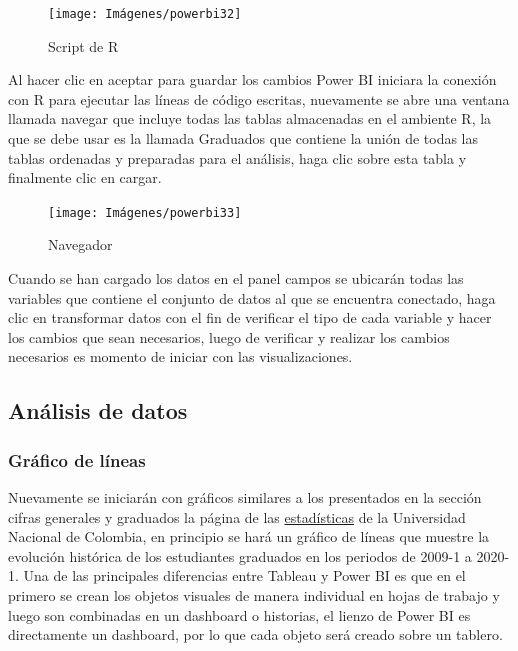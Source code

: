 \documentclass[
]{book}
\begin{document}
\begin{figure}

{\centering \texttt{[image: Imágenes/powerbi32]} 

}

\caption{Script de R}\label{fig:scriptdeR-fig}
\end{figure}

Al hacer clic en aceptar para guardar los cambios Power BI iniciara la conexión con R para ejecutar las líneas de código escritas, nuevamente se abre una ventana llamada navegar que incluye todas las tablas almacenadas en el ambiente R, la que se debe usar es la llamada Graduados que contiene la unión de todas las tablas ordenadas y preparadas para el análisis, haga clic sobre esta tabla y finalmente clic en cargar.

\begin{figure}

{\centering \texttt{[image: Imágenes/powerbi33]} 

}

\caption{Navegador}\label{fig:Navegador-fig}
\end{figure}

Cuando se han cargado los datos en el panel campos se ubicarán todas las variables que contiene el conjunto de datos al que se encuentra conectado, haga clic en transformar datos con el fin de verificar el tipo de cada variable y hacer los cambios que sean necesarios, luego de verificar y realizar los cambios necesarios es momento de iniciar con las visualizaciones.

\hypertarget{analisisdatospowerbi}{%
\subsection{Análisis de datos}\label{analisisdatospowerbi}}

\hypertarget{graficolineaspowerbi}{%
\subsubsection{Gráfico de líneas}\label{graficolineaspowerbi}}

Nuevamente se iniciarán con gráficos similares a los presentados en la sección cifras generales y graduados la página de las \href{http://estadisticas.unal.edu.co/home/}{estadísticas} de la Universidad Nacional de Colombia, en principio se hará un gráfico de líneas que muestre la evolución histórica de los estudiantes graduados en los periodos de 2009-1 a 2020-1. Una de las principales diferencias entre Tableau y Power BI es que en el primero se crean los objetos visuales de manera individual en hojas de trabajo y luego son combinadas en un dashboard o historias, el lienzo de Power BI es directamente un dashboard, por lo que cada objeto será creado sobre un tablero.
\end{document}

